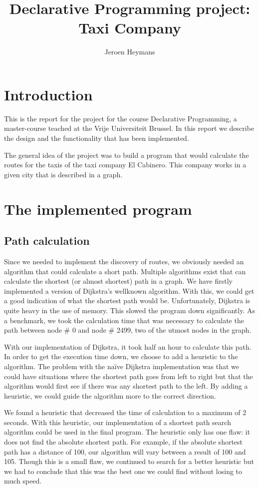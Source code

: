 \documentclass[10pt,a4paper]{article}
\author{Jeroen Heymans}
\title{Declarative Programming project: Taxi Company}
\begin{document}
\maketitle
\tableofcontents

\section{Introduction}
This is the report for the project for the course Declarative Programming, a master-course teached at the Vrije Universiteit Brussel. In this report we describe the design and the functionality that has been implemented.

The general idea of the project was to build a program that would calculate the routes for the taxis of the taxi company El Cabinero. This company works in a given city that is described in a graph.

\section{The implemented program}

\subsection{Path calculation}

Since we needed to implement the discovery of routes, we obviously needed an algorithm that could calculate a short path. Multiple algorithms exist that can calculate the shortest (or almost shortest) path in a graph. We have firstly implemented a version of Dijkstra's wellknown algorithm. With this, we could get a good indication of what the shortest path would be. Unfortunately, Dijkstra is quite heavy in the use of memory. This slowed the program down significantly. As a benchmark, we took the calculation time that was necessary to calculate the path between node \# 0 and node \# 2499, two of the utmost nodes in the graph.

With our implementation of Dijkstra, it took half an hour to calculate this path. In order to get the execution time down, we choose to add a heuristic to the algorithm. The problem with the naïve Dijkstra implementation was that we could have situations where the shortest path goes from left to right but that the algorithm would first see if there was any shortest path to the left. By adding a heuristic, we could guide the algorithm more to the correct direction.

We found a heuristic that decreased the time of calculation to a maximum of 2 seconds. With this heuristic, our implementation of a shortest path search algorithm could be used in the final program. The heuristic only has one flaw: it does not find the absolute shortest path. For example, if the absolute shortest path has a distance of 100, our algorithm will vary between a result of 100 and 105. Though this is a small flaw, we continued to search for a better heuristic but we had to conclude that this was the best one we could find without losing to much speed.
\end{document}
